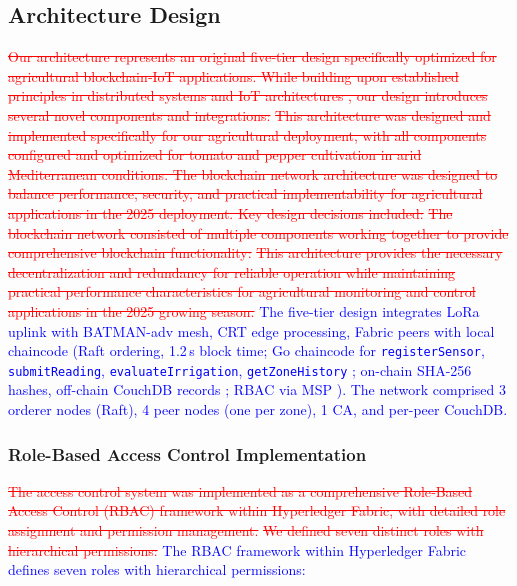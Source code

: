 \documentclass[pdflatex,sn-mathphys-num]{sn-jnl}
\theoremstyle{thmstyleone}
\theoremstyle{thmstyletwo}
\theoremstyle{thmstylethree}
\begin{document}
{\subsection{Architecture Design}
\label{subsec:architecture_design}

\textcolor{red}{\sout{Our architecture represents an original five‑tier design specifically optimized for agricultural blockchain‑IoT applications. While building upon established principles in distributed systems and IoT architectures , our design introduces several novel components and integrations:}}
\textcolor{red}{\sout{This architecture was designed and implemented specifically for our agricultural deployment, with all components configured and optimized for tomato and pepper cultivation in arid Mediterranean conditions. The blockchain network architecture was designed to balance performance, security, and practical implementability for agricultural applications in the 2025 deployment. Key design decisions included:}}
\textcolor{red}{\sout{The blockchain network consisted of multiple components working together to provide comprehensive blockchain functionality:}}
\textcolor{red}{\sout{This architecture provides the necessary decentralization and redundancy for reliable operation while maintaining practical performance characteristics for agricultural monitoring and control applications in the 2025 growing season.}}
\textcolor{blue}{The five-tier design \cite{gubbi2013internet, christidis2016blockchain} integrates LoRa uplink with BATMAN-adv mesh, CRT edge processing, Fabric peers with local chaincode (Raft ordering, 1.2\,s block time; Go chaincode for \texttt{registerSensor}, \texttt{submitReading}, \texttt{evaluateIrrigation}, \texttt{getZoneHistory} \cite{orderingServiceDoc}; on-chain SHA-256 hashes, off-chain CouchDB records \cite{privateDataDoc}; RBAC via MSP \cite{mdpiAccessControl}). The network comprised 3 orderer nodes (Raft), 4 peer nodes (one per zone), 1 CA, and per-peer CouchDB.}

\subsubsection{Role-Based Access Control Implementation}
\label{subsubsec:rbac_implementation}

\textcolor{red}{\sout{The access control system was implemented as a comprehensive Role‑Based Access Control (RBAC) framework within Hyperledger Fabric, with detailed role assignment and permission management.}}
\textcolor{red}{\sout{We defined seven distinct roles with hierarchical permissions:}}
\textcolor{blue}{The RBAC framework within Hyperledger Fabric defines seven roles with hierarchical permissions:}

}
\end{document}
